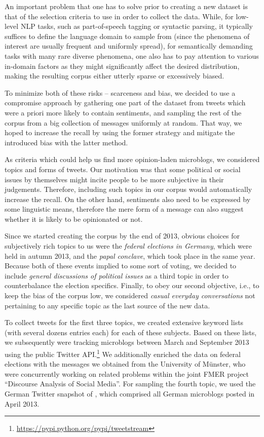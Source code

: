 An important problem that one has to solve prior to creating a new
dataset is that of the selection criteria to use in order to collect
the data.  While, for low-level NLP tasks, such as part-of-speech
tagging or syntactic parsing, it typically suffices to define the
language domain to sample from (since the phenomena of interest are
usually frequent and uniformly spread), for semantically demanding
tasks with many rare diverse phenomena, one also has to pay attention
to various in-domain factors as they might significantly affect the
desired distribution, making the resulting corpus either utterly
sparse or excessively biased.

To minimize both of these risks -- scarceness and bias, we decided to
use a compromise approach by gathering one part of the dataset from
tweets which were a priori more likely to contain sentiments, and
sampling the rest of the corpus from a big collection of messages
uniformly at random.  That way, we hoped to increase the recall by
using the former strategy and mitigate the introduced bias with the
latter method.

As criteria which could help us find more opinion-laden microblogs, we
considered topics and forms of tweets.  Our motivation was that some
political or social issues by themselves might incite people to be
more subjective in their judgements.  Therefore, including such topics
in our corpus would automatically increase the recall.  On the other
hand, sentiments also need to be expressed by some linguistic means,
therefore the mere form of a message can also suggest whether it is
likely to be opinionated or not.

Since we started creating the corpus by the end of 2013, obvious
choices for subjectively rich topics to us were the \emph{federal
  elections in Germany}, which were held in autumn 2013, and the
\emph{papal conclave}, which took place in the same year.  Because
both of these events implied to some sort of voting, we decided to
include \emph{general discussions of political issues} as a third
topic in order to counterbalance the election specifics.  Finally, to
obey our second objective, i.e., to keep the bias of the corpus low,
we considered \emph{casual everyday conversations} not pertaining to
any specific topic as the last source of the new data.

To collect tweets for the first three topics, we created extensive
keyword lists (with several dozens entries each) for each of these
subjects.  Based on these lists, we subsequently were tracking
microblogs between March and September 2013 using the public Twitter
API.\footnote{\url{https://pypi.python.org/pypi/tweetstream}} We
additionally enriched the data on federal elections with the messages
we obtained from the University of M\"unster, who were concurrently
working on related problems within the joint FMER project ``Discourse
Analysis of Social Media''.  For sampling the fourth topic, we used
the German Twitter snapshot of \citet{Scheffler:14}, which comprised
all German microblogs posted in April 2013.

